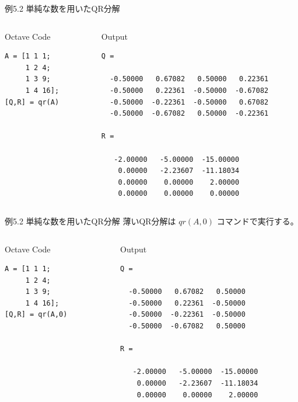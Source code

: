 \documentclass[dvipdfmx,10pt,presentation]{beamer}
\begin{document}
\begin{frame}[fragile,label={sec:orgc28776f}]{例5.2 単純な数を用いたQR分解}
 \begin{columns}
\begin{column}{0.23\columnwidth}
\begin{block}{Octave Code}
\begin{verbatim}
A = [1 1 1;
     1 2 4; 
     1 3 9;
     1 4 16];
[Q,R] = qr(A)
\end{verbatim}
\end{block}
\end{column}

\begin{column}{0.73\columnwidth}
\begin{block}{Output}
\begin{verbatim}
Q =

  -0.50000   0.67082   0.50000   0.22361
  -0.50000   0.22361  -0.50000  -0.67082
  -0.50000  -0.22361  -0.50000   0.67082
  -0.50000  -0.67082   0.50000  -0.22361

R =

   -2.00000   -5.00000  -15.00000
    0.00000   -2.23607  -11.18034
    0.00000    0.00000    2.00000
    0.00000    0.00000    0.00000

\end{verbatim}
\end{block}
\end{column}
\end{columns}
\end{frame}

\begin{frame}[fragile,label={sec:orga4f64f1}]{例5.2 単純な数を用いたQR分解}
 薄いQR分解は \(qr(A,0)\) コマンドで実行する。\\
\begin{columns}
\begin{column}{0.3\columnwidth}
\begin{block}{Octave Code}
\begin{verbatim}
A = [1 1 1;
     1 2 4; 
     1 3 9;
     1 4 16];
[Q,R] = qr(A,0)
\end{verbatim}
\end{block}
\end{column}
\begin{column}{0.65\columnwidth}
\begin{block}{Output}
\begin{verbatim}
Q =

  -0.50000   0.67082   0.50000
  -0.50000   0.22361  -0.50000
  -0.50000  -0.22361  -0.50000
  -0.50000  -0.67082   0.50000

R =

   -2.00000   -5.00000  -15.00000
    0.00000   -2.23607  -11.18034
    0.00000    0.00000    2.00000

\end{verbatim}
\end{block}
\end{column}
\end{columns}
\end{frame}
\end{document}
